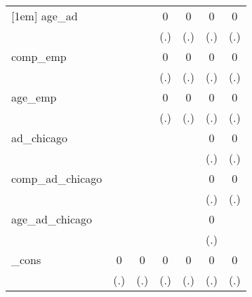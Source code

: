 {\begin{tabular}{l*{6}{c}}
[1em]
age\_ad      &                     &                     &           0         &           0         &           0         &           0         \\
            &                     &                     &         (.)         &         (.)         &         (.)         &         (.)         \\
[1em]
comp\_emp    &                     &                     &           0         &           0         &           0         &           0         \\
            &                     &                     &         (.)         &         (.)         &         (.)         &         (.)         \\
[1em]
age\_emp     &                     &                     &           0         &           0         &           0         &           0         \\
            &                     &                     &         (.)         &         (.)         &         (.)         &         (.)         \\
[1em]
ad\_chicago  &                     &                     &                     &                     &           0         &           0         \\
            &                     &                     &                     &                     &         (.)         &         (.)         \\
[1em]
comp\_ad\_chicago&                     &                     &                     &                     &           0         &           0         \\
            &                     &                     &                     &                     &         (.)         &         (.)         \\
[1em]
age\_ad\_chicago&                     &                     &                     &                     &           0         &                     \\
            &                     &                     &                     &                     &         (.)         &                     \\
[1em]
\_cons      &           0         &           0         &           0         &           0         &           0         &           0         \\
            &         (.)         &         (.)         &         (.)         &         (.)         &         (.)         &         (.)         \\

\end{tabular}}
